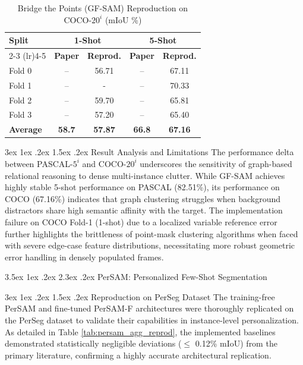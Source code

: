 \documentclass[journal,12pt,onecolumn,draftclsnofoot]{IEEEtran}
\makeatletter
\renewcommand{\section}{\@startsection{section}{1}{\z@}%
    {3.5ex \@plus 1ex \@minus .2ex}%
    {2.3ex \@plus.2ex}%
    {\normalfont\Large\bfseries}}
\renewcommand{\subsection}{\@startsection{subsection}{2}{\z@}%
    {3ex \@plus 1ex \@minus .2ex}%
    {1.5ex \@plus.2ex}%
    {\normalfont\large\bfseries}}
\makeatother
\begin{document}
\begin{table}[htbp]
\centering
\caption{Bridge the Points (GF-SAM) Reproduction on COCO-$20^i$ (mIoU \%)}
\label{tab:gfsam_reprod_coco}
\begin{tabular}{l c c c c}
\toprule
\multirow{2}{*}{\textbf{Split}} & \multicolumn{2}{c}{\textbf{1-Shot}} & \multicolumn{2}{c}{\textbf{5-Shot}} \\
\cmidrule(lr){2-3} \cmidrule(lr){4-5}
& \textbf{Paper} & \textbf{Reprod.} & \textbf{Paper} & \textbf{Reprod.} \\
\midrule
Fold 0 & -- & 56.71 & -- & 67.11 \\
Fold 1 & -- & - & -- & 70.33 \\
Fold 2 & -- & 59.70 & -- & 65.81 \\
Fold 3 & -- & 57.20 & -- & 65.40 \\
\midrule
\textbf{Average} & \textbf{58.7} & \textbf{57.87} & \textbf{66.8} & \textbf{67.16} \\
\bottomrule
\end{tabular}
\end{table}

\subsection{Result Analysis and Limitations}
The performance delta between PASCAL-$5^i$ and COCO-$20^i$ underscores the sensitivity of graph-based relational reasoning to dense multi-instance clutter. While GF-SAM achieves highly stable 5-shot performance on PASCAL (82.51\%), its performance on COCO (67.16\%) indicates that graph clustering struggles when background distractors share high semantic affinity with the target. The implementation failure on COCO Fold-1 (1-shot) due to a localized variable reference error further highlights the brittleness of point-mask clustering algorithms when faced with severe edge-case feature distributions, necessitating more robust geometric error handling in densely populated frames.


\newpage



\section{PerSAM: Personalized Few-Shot Segmentation \cite{zhang2024persam}}

\subsection{Reproduction on PerSeg Dataset}
The training-free PerSAM and fine-tuned PerSAM-F architectures were thoroughly replicated on the PerSeg dataset to validate their capabilities in instance-level personalization. As detailed in Table \ref{tab:persam_agg_reprod}, the implemented baselines demonstrated statistically negligible deviations ($\le$ 0.12\% mIoU) from the primary literature, confirming a highly accurate architectural replication.
\end{document}
